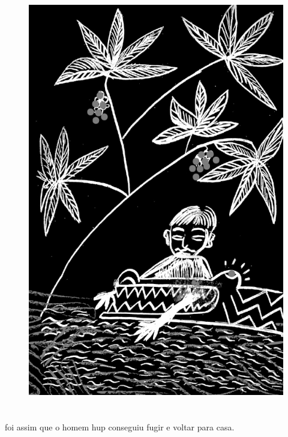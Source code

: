 \begin{figure}
\vspace*{-1.5cm}
\hspace*{-2.4cm}\includegraphics[width=142mm]{./imgs/img7.jpg}
\end{figure}

\chapter*{}

\mbox{}\vspace*{\fill}

 foi assim que
o homem hup
conseguiu fugir e
voltar para casa.

\medskip

